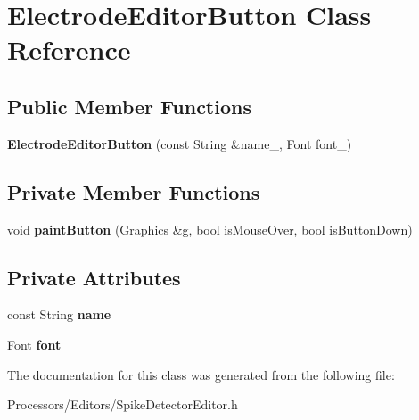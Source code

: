 \hypertarget{classElectrodeEditorButton}{\section{Electrode\-Editor\-Button Class Reference}
\label{classElectrodeEditorButton}
}
\subsection*{Public Member Functions}
\begin{DoxyCompactItemize}
\item 
\hypertarget{classElectrodeEditorButton_a41ee69863e123b19d0cb5407532edf39}{{\bfseries Electrode\-Editor\-Button} (const String \&name\-\_\-, Font font\-\_\-)}\label{classElectrodeEditorButton_a41ee69863e123b19d0cb5407532edf39}

\end{DoxyCompactItemize}
\subsection*{Private Member Functions}
\begin{DoxyCompactItemize}
\item 
\hypertarget{classElectrodeEditorButton_ac93bd656e8c2fa725ad1406bccdd8e30}{void {\bfseries paint\-Button} (Graphics \&g, bool is\-Mouse\-Over, bool is\-Button\-Down)}\label{classElectrodeEditorButton_ac93bd656e8c2fa725ad1406bccdd8e30}

\end{DoxyCompactItemize}
\subsection*{Private Attributes}
\begin{DoxyCompactItemize}
\item 
\hypertarget{classElectrodeEditorButton_a0722a63b6adf39abe15524e76df92f5e}{const String {\bfseries name}}\label{classElectrodeEditorButton_a0722a63b6adf39abe15524e76df92f5e}

\item 
\hypertarget{classElectrodeEditorButton_a8efaf1a6be14e7fe174e30fca8d50a7f}{Font {\bfseries font}}\label{classElectrodeEditorButton_a8efaf1a6be14e7fe174e30fca8d50a7f}

\end{DoxyCompactItemize}


The documentation for this class was generated from the following file\-:\begin{DoxyCompactItemize}
\item 
Processors/\-Editors/Spike\-Detector\-Editor.\-h\end{DoxyCompactItemize}
